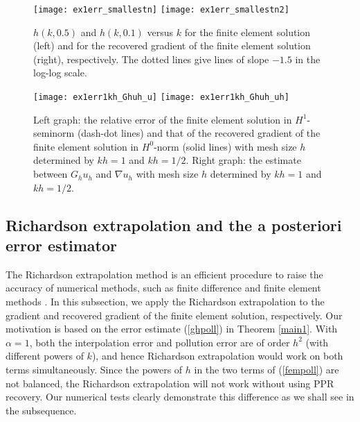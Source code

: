 \documentclass[leqno,final]{siamltex}
\numberwithin{equation}{section}
\newcommand{\na}{\nabla}
\begin{document}
\begin{figure}[htbp]
\begin{center}
\texttt{[image: ex1err\_smallestn]}
\texttt{[image: ex1err\_smallestn2]}
\caption{$h(k,0.5)$ and $h(k,0.1)$ versus $k$ for the finite element solution (left) and for the recovered gradient of the finite element solution (right), respectively. The dotted lines give lines of slope $-1.5$ in the log-log scale.}
\label{num-fig3}
\end{center}
\end{figure}

\begin{figure}[htbp]
\begin{center}
\texttt{[image: ex1err1kh\_Ghuh\_u]}
\texttt{[image: ex1err1kh\_Ghuh\_uh]}
\caption{Left graph: the relative error of the finite element solution in $H^1$-seminorm (dash-dot lines) and that of the recovered gradient of the finite element solution in $H^0$-norm (solid lines) with mesh size $h$ determined by $kh=1$ and $kh=1/2$. Right graph: the estimate between $G_hu_h$ and $\na u_h$ with mesh size $h$ determined by $kh=1$ and $kh=1/2$.}
\label{num-fig4}
\end{center}
\end{figure}

\subsection{Richardson extrapolation and the a posteriori error estimator} \label{sec_richardson_posteriori}
The Richardson extrapolation method is an efficient procedure to raise the accuracy of numerical methods, such as finite difference \cite{ms83} and finite element methods \cite{br86,w89,h83,lsy98}. In this subsection, we apply the Richardson extrapolation to the gradient and recovered gradient of the finite element solution, respectively.
Our motivation is based on the error estimate (\ref{ghpoll}) in Theorem \ref{main1}.
With $\alpha=1$, both the interpolation error and pollution error are of order $h^2$ (with different powers of $k$),
and hence Richardson extrapolation would work on both terms simultaneously.
Since the powers of $h$ in the two terms of (\ref{fempoll}) are not balanced, the Richardson extrapolation will not work without using PPR recovery.
Our numerical tests clearly demonstrate this difference as we shall see in the subsequence.
\end{document}
